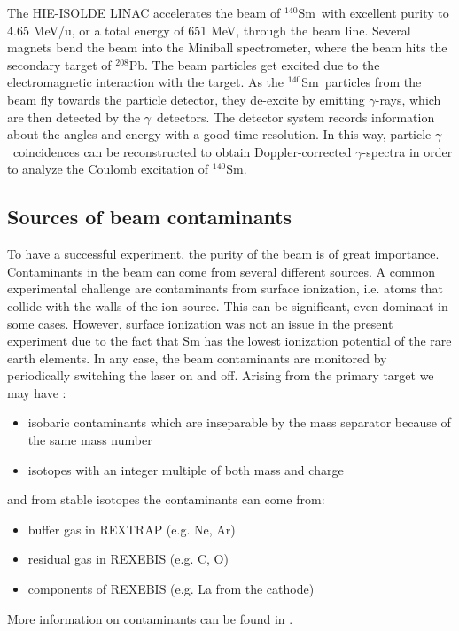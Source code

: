 \documentclass[twoside,english]{uiofysmaster/uiofysmaster}
\newcommand{\Sm}{$^{140}$Sm} %
\newcommand{\Pb}{$^{208}$Pb}
\newcommand{\ga}{$\gamma$}
\let\orgautoref\autoref
\renewcommand{\autoref}
        {%
		 \def\sectionautorefname{Section}%
		 \def\subsectionautorefname{Section}%
		 \def\subsubsectionautorefname{Section}%
		 \def\chapterautorefname{Chapter}%
          \orgautoref}
\begin{document}
The HIE-ISOLDE LINAC accelerates the beam of \Sm\ with excellent purity to 4.65 MeV/u, or a total energy of 651 MeV, through the beam line. 
Several magnets bend the beam into the Miniball spectrometer, where the beam hits the secondary target of \Pb. 
The beam particles get excited due to the electromagnetic interaction with the target.
As the \Sm\ particles from the beam fly towards the particle detector, they de-excite by emitting \ga-rays, which are then detected by the \ga\ detectors.
The detector system records information about the angles and energy with a good time resolution. 
In this way, particle-\ga\ coincidences can be reconstructed to obtain Doppler-corrected \ga-spectra  in order to analyze the Coulomb excitation of \Sm.


\subsection{Sources of beam contaminants}\label{ssec:bcontaminants}
To have a successful experiment, the purity of the beam is of great importance. Contaminants in the beam can come from several different sources. 
A common experimental challenge are contaminants from surface ionization, i.e. atoms that collide with the walls of the ion source. 
This can be significant, even dominant in some cases. 
However, surface ionization was not an issue in the present experiment due to the fact that Sm has the lowest ionization potential of the rare earth elements. 
In any case, the beam contaminants are monitored by periodically switching the laser on and off.
Arising from the primary target we may have \cite{MB-spect}:
\begin{itemize}
	\item isobaric contaminants which are inseparable by the mass separator because of the same mass number
	\item isotopes with an integer multiple of both mass and charge
\end{itemize}
and from stable isotopes the contaminants can come from:
\begin{itemize}
	\item buffer gas in REXTRAP (e.g. Ne, Ar)
	\item residual gas in REXEBIS (e.g. C, O)
	\item components of REXEBIS (e.g. La from the cathode)
\end{itemize}
More information on contaminants can be found in \cite{HIE-ISOLDE, RILIS, MB-spect}.
\end{document}

